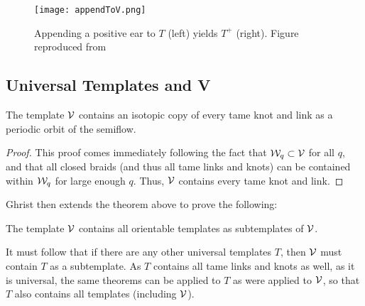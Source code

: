 \documentclass[paper.tex]{subfiles}
\begin{document}
\begin{figure}[h]
    \centering
    \texttt{[image: appendToV.png]}
    \caption{Appending a positive ear to $T$ (left) yields $T^+$ (right). Figure reproduced from~\cite{Ghrist1996}} \label{fig:appendToV} %
\end{figure}



\subsection{Universal Templates and V}

\begin{thm}[Ghrist 1996]
    The template $\mathcal{V}$ contains an isotopic copy of every tame knot and link as a periodic orbit of the semiflow.
\end{thm}
\begin{proof}
    This proof comes immediately following the fact that $\mathcal{W}_q \subset \mathcal{V}$ for all $q$, and that all closed braids (and thus all tame links and knots) can be contained within $\mathcal{W}_q$ for large enough $q$. Thus, $\mathcal{V}$ contains every tame knot and link.
\end{proof}


Ghrist then extends the theorem above to prove the following:

\begin{thm}[Ghrist 1996]
    The template $\mathcal{V}$ contains all orientable templates as subtemplates of $\mathcal{V}$.
\end{thm}

It must follow that if there are any other universal templates $T$, then $\mathcal{V}$ must contain $T$ as a subtemplate. As $T$ contains all tame links and knots as well, as it is universal, the same theorems can be applied to $T$ as were applied to $\mathcal{V}$, so that $T$ also contains all templates (including $\mathcal{V}$).
\end{document}
